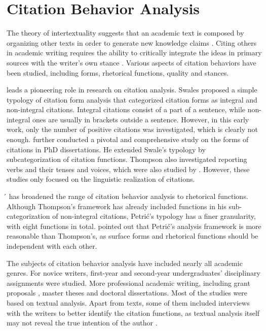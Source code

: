 
\section{Citation Behavior Analysis}
The theory of intertextuality suggests that an academic text is composed by organizing other texts in order to generate new knowledge claims \citep{fairclough_intertextuality_1992, shi_textual_2010}. Citing others in academic writing requires the ability to critically integrate the ideas in primary sources with the writer’s own stance \citep{wette_source_2017}. Various aspects of citation behaviors have been studied, including forms, rhetorical functions, quality and stances.

\citet{swales_citation_1986} leads a pioneering role in research on citation analysis. Swales proposed a simple typology of citation form analysis that categorized citation forms as integral and non-integral citations. Integral citations consist of a part of a sentence, while non-integral ones are usually in brackets outside a sentence. However, in this early work, only the number of positive citations was investigated, which is clearly not enough. \citet{thompson_looking_2001} further conducted a pivotal and comprehensive study on the forms of citations in PhD dissertations. He extended Swale’s typology by subcategorization of citation functions. Thompson also investigated reporting verbs and their tenses and voices, which were also studied by \citet{manan_analysis_2014}. However, these studies only focused on the linguistic realization of citations.

\citet{petric_rhetorical_2007}́ has broadened the range of citation behavior analysis to rhetorical functions. Although Thompson’s framework has already included functions in his sub- categorization of non-integral citations, Petrić’s typology has a finer granularity, with eight functions in total. \citet{samraj_form_2013} pointed out that Petrić’s analysis framework is more reasonable than Thompson’s, as surface forms and rhetorical functions should be independent with each other.

The subjects of citation behavior analysis have included nearly all academic genres. For novice writers, first-year \citep{lee_citation_2018} and second-year \citep{wette_source_2017} undergraduates’ disciplinary assignments were studied. More professional academic writing, including grant proposals \citep{fazel_citation_2015}, master theses and doctoral dissertations. Most of the studies were based on textual analysis. Apart from texts, some of them \citep{fazel_citation_2015,harwood_interview-based_2009,wette_source_2017} included interviews with the writers to better identify the citation functions, as textual analysis itself may not reveal the true intention of the author \citep{harwood_interview-based_2009}.

